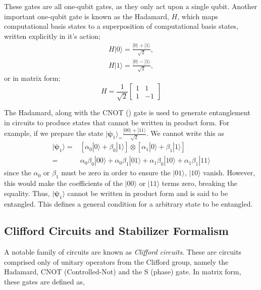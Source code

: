 These gates are all one-qubit gates, as they only act upon a single qubit. Another important one-qubit gate is
known as the Hadamard, $H$, which maps computational basis states to a superposition of computational basis states,
written explicitly in it's action;
\begin{align*}
    H |0\rangle = \frac{|0\rangle + |1\rangle}{\sqrt{2}}, \\
    H |1\rangle = \frac{|0\rangle - |1\rangle}{\sqrt{2}},
\end{align*}
or in matrix form;
\begin{equation*}
    H = \frac{1}{\sqrt{2}} \begin{bmatrix}
        1 & 1  \\
        1 & -1
    \end{bmatrix}
\end{equation*}

The Hadamard, along with the CNOT () gate is used to generate entanglement in circuits to produce states that cannot be written in product form. For example, if we prepare the state
$|{\bm\psi}_1\rangle_ = \frac{|00\rangle + |11\rangle}{\sqrt{2}}$. We cannot write this as 
\begin{align*}
    |{\bm\psi}_1\rangle =& \left[ \alpha_0 |0\rangle + \beta_0|1\rangle\right] \otimes \left[\alpha_1 |0\rangle + \beta_1|1\rangle\right] \\
    =& \alpha_0\beta_0 |00\rangle + \alpha_0\beta_1|01\rangle + \alpha_1\beta_0|10\rangle + \alpha_1\beta_1|11\rangle
\end{align*}
since the $\alpha_0$ or $\beta_1$ must be zero in order to ensure the $|01\rangle$, $|10\rangle$ vanish. However, this would make the coefficients of the $|00\rangle$ 
or $|11\rangle$ terms zero, breaking the equality. Thus, $|{\bm\psi}_1\rangle$ cannot be written in product form and is said to be entangled. This defines a general condition for a arbitrary state to be entangled.


\subsection{Clifford Circuits and Stabilizer Formalism}
A notable family of circuits are known as \textit{Clifford circuits}. These are circuits comprised only of unitary operators 
from the Clifford group, namely the Hadamard, CNOT (Controlled-Not) and the S (phase) gate. In matrix form, these gates are defined as,

